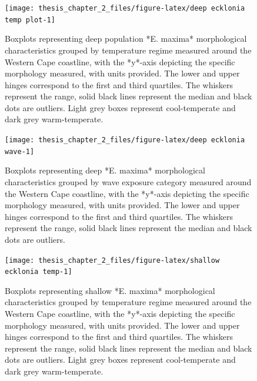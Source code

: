 \documentclass[
  a4paper,
]{article}
\begin{document}
\begin{figure}

{\centering \texttt{[image: thesis\_chapter\_2\_files/figure-latex/deep ecklonia temp plot-1]} 

}

\caption{\label{fig:deep eck temp plot}Boxplots representing deep population *E. maxima* morphological characteristics grouped by temperature regime measured around the Western Cape coastline, with the *y*-axis depicting the specific morphology measured, with units provided. The lower and upper hinges correspond to the first and third quartiles. The whiskers represent the range, solid black lines represent the median and black dots are outliers. Light grey boxes represent cool-temperate and dark grey warm-temperate.}\label{fig:deep ecklonia temp plot}
\end{figure}

\begin{figure}

{\centering \texttt{[image: thesis\_chapter\_2\_files/figure-latex/deep ecklonia wave-1]} 

}

\caption{\label{fig:deep ecklonia wave}Boxplots representing deep *E. maxima* morphological characteristics grouped by wave exposure category measured around the Western Cape coastline, with the *y*-axis depicting the specific morphology measured, with units provided. The lower and upper hinges correspond to the first and third quartiles. The whiskers represent the range, solid black lines represent the median and black dots are outliers.}\label{fig:deep ecklonia wave}
\end{figure}

\begin{figure}

{\centering \texttt{[image: thesis\_chapter\_2\_files/figure-latex/shallow ecklonia temp-1]} 

}

\caption{\label{fig:shallow ecklonia temp} Boxplots representing shallow *E. maxima* morphological characteristics  grouped by temperature regime measured around the Western Cape coastline, with the *y*-axis depicting the specific morphology measured, with units provided. The lower and upper hinges correspond to the first and third quartiles. The whiskers represent the range, solid black lines represent the median and black dots are outliers. Light grey boxes represent cool-temperate and dark grey warm-temperate.}\label{fig:shallow ecklonia temp}
\end{figure}
\end{document}
